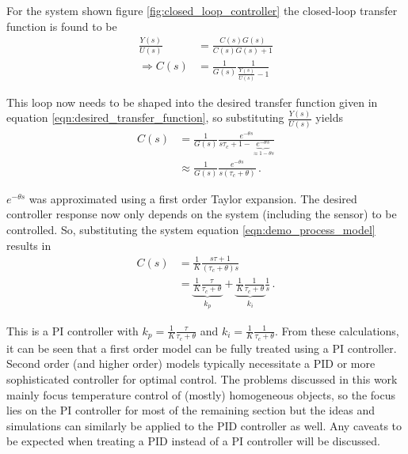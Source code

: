 For the system shown figure \ref{fig:closed_loop_controller} the closed-loop transfer function is found to be
\begin{align*}
    \frac{Y(s)}{U(s)} &= \frac{C(s) G(s)}{C(s) G(s) + 1} \\
    \Rightarrow C(s) &= \frac{1}{G(s)} \frac{1}{\frac{Y(s)}{U(s)} -1}
\end{align*}

This loop now needs to be shaped into the desired transfer function given in equation \ref{eqn:desired_transfer_function}, so substituting $\frac{Y(s)}{U(s)}$ yields
\begin{align}
    C(s) &= \frac{1}{G(s)} \frac{e^{-\theta s}}{s \tau_c +1 - \underbrace{e^{-\theta s}}_{\approx 1 - \theta s}}\\
    &\approx \frac{1}{G(s)} \frac{e^{-\theta s}}{s (\tau_c + \theta)} \,.
\end{align}

$e^{-\theta s}$ was approximated using a first order Taylor expansion. The desired controller response now only depends on the system (including the sensor) to be controlled. So, substituting the system equation \ref{eqn:demo_process_model} results in
\begin{align}
    C(s) &= \frac{1}{K} \frac{s \tau + 1}{(\tau_c + \theta) s} \nonumber\\
    &= \underbrace{\frac{1}{K} \frac{\tau}{\tau_c + \theta}}_{k_p} + \underbrace{\frac{1}{K} \frac{1}{\tau_c + \theta}}_{k_i} \frac{1}{s}\,.
\end{align}

This is a PI controller with $k_p = \frac{1}{K} \frac{\tau}{\tau_c + \theta}$ and $k_i = \frac{1}{K} \frac{1}{\tau_c + \theta}$. From these calculations, it can be seen that a first order model can be fully treated using a PI controller. Second order (and higher order) models typically necessitate a PID or more sophisticated controller for optimal control. The problems discussed in this work mainly focus temperature control of (mostly) homogeneous objects, so the focus lies on the PI controller for most of the remaining section but the ideas and simulations can similarly be applied to the PID controller as well. Any caveats to be expected when treating a PID instead of a PI controller will be discussed.

